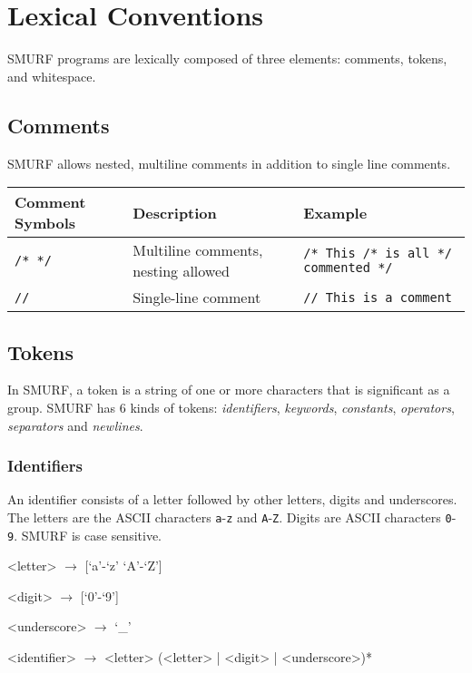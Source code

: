 \section{Lexical Conventions}
SMURF programs are lexically composed of three elements: comments, tokens, and whitespace.

\subsection{Comments}
SMURF allows nested, multiline comments in addition to single line comments.
\begin{table} [H]
\centering
\begin{tabularx}{\textwidth}{lXl}
\hline\hline
Comment Symbols & Description & Example \\
\hline\hline
  \texttt{/* */} & Multiline comments, nesting allowed & \texttt{/* This /* is all */ commented */} \\ \hline
  \texttt{//} & Single-line comment & \texttt{// This is a comment} \\ \hline
\end{tabularx}
\end{table}


\subsection{Tokens}
In SMURF, a token is a string of one or more characters that is significant as a group.
SMURF has 6 kinds of tokens: {\it identifiers}, {\it keywords}, {\it constants},
      {\it operators},
{\it separators} and {\it newlines}.

\subsubsection{Identifiers}
\label{sec:identifiers}
An identifier consists of a letter followed by other letters, 
digits and underscores. The letters are the ASCII characters \texttt{a}-\texttt{z} and
\texttt{A}-\texttt{Z}. Digits are ASCII characters \texttt{0}-\texttt{9}. SMURF is case sensitive.

\begin{grammar}
<letter> $\rightarrow$ [`a'-`z' `A'-`Z'] 

<digit> $\rightarrow$ [`0'-`9'] 

<underscore> $\rightarrow$ {`_'} 

<identifier> $\rightarrow$ <letter> (<letter> | <digit> | <underscore>)*
\end{grammar}

